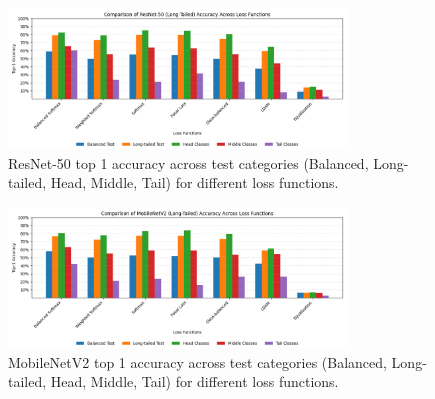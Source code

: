 


\begin{figure}[h!]
    \centering
    \includegraphics[width=0.8\textwidth]{Images/Plots/resnet_lt_loss_comparison.png}
    \caption{ResNet-50 top 1 accuracy across test categories (Balanced, Long-tailed, Head, Middle, Tail) for different loss functions.}
    \label{fig:resnet_lt_loss_comparison}
\end{figure}
\FloatBarrier

\begin{figure}[h!]
    \centering
    \includegraphics[width=0.8\textwidth]{Images/Plots/mobilenet_lt_loss_comparison.png}
    \caption{MobileNetV2 top 1 accuracy across test categories (Balanced, Long-tailed, Head, Middle, Tail) for different loss functions.}
    \label{fig:mobilenet_lt_loss_comparison}
\end{figure}
\FloatBarrier

